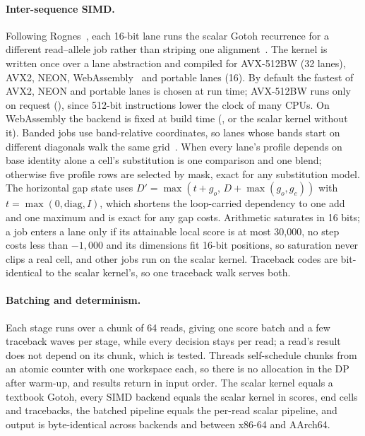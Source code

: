 \documentclass[11pt,a4paper]{article}
\begin{document}
\paragraph{Inter-sequence SIMD.} Following Rognes~\cite{rognes2011}, each
16-bit lane runs the scalar Gotoh recurrence for a different read--allele job
rather than striping one alignment~\cite{farrar2007}. The kernel is written
once over a lane abstraction and compiled for AVX-512BW (32 lanes), AVX2,
NEON, WebAssembly~\cite{haas2017wasm}  and portable lanes (16).
By default the fastest of AVX2, NEON and portable lanes is chosen at run time;
AVX-512BW runs only on request (), since 512-bit
instructions lower the clock of many CPUs. On WebAssembly the backend is
fixed at build time (, or the scalar kernel without it).
Banded jobs use band-relative coordinates, so lanes whose
bands start on different diagonals walk the same grid~\cite{chao1992band}.
When every lane's profile depends on base identity alone a cell's
substitution is one comparison and one blend; otherwise five profile rows are
selected by mask, exact for any substitution model. The horizontal gap state
uses $D'=\max(t+g_o,\,D+\max(g_o,g_e))$ with $t=\max(0,\text{diag},I)$, which
shortens the loop-carried dependency to one add and one maximum and is exact
for any gap costs. Arithmetic saturates in 16 bits; a job enters a lane only
if its attainable local score is at most 30,000, no step costs less than
$-1{,}000$ and its dimensions fit 16-bit positions, so saturation never clips
a real cell, and other jobs run on the scalar kernel.
Traceback codes are bit-identical to the scalar kernel's, so one traceback
walk serves both.

\paragraph{Batching and determinism.} Each stage runs over a chunk of 64
reads, giving one score batch and a few traceback waves per stage, while
every decision stays per read; a read's result does not depend on its chunk,
which is tested. Threads self-schedule chunks from an atomic counter with
one workspace each, so there is no allocation in the DP after warm-up, and
results return in input order. The scalar kernel equals a textbook Gotoh,
every SIMD backend equals the scalar kernel in scores, end cells and
tracebacks, the batched pipeline equals the per-read scalar pipeline, and
output is byte-identical across backends and between x86-64 and AArch64.
\end{document}
